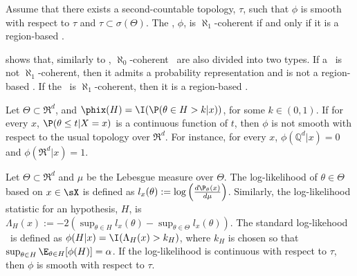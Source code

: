 \begin{theorem}
 \label{thm:second-countable}
 Assume that there exists 
 a second-countable topology, $\tau$, 
 such that $\phi$ is smooth
 with respect to $\tau$ and
 $\tau \subset \sigma(\Theta)$.
 The \summ, $\phi$, is $\aleph_1$-coherent
 if and only if
 it is a region-based \summ.
\end{theorem}

 shows that,
similarly to \stdsumms,
$\aleph_0$-coherent 
\summs \ are also 
divided into two types.
If a \summ \ is not $\aleph_1$-coherent, then
it admits a probability representation and
is not a region-based \summ.
If the \summ \ is $\aleph_1$-coherent, then
it is a region-based \summ.


\begin{example}
 Let $\Theta \subset \Re^d$, and $\phix(H) = \I(\P(\theta \in H > k|x))$, for some $k \in (0,1)$. If for every $x$, $\P(\theta \leq t|X=x)$ is a continuous function of $t$, then $\phi$ is not smooth with respect to the usual topology over $\Re^d$. For instance, for every $x$, $\phi(\mathbb{Q}^d|x) = 0$ and $\phi(\Re^d|x) = 1$.
\end{example}

\begin{example}
 Let $\Theta \subset \Re^d$ and
 $\mu$ be the Lebesgue measure over $\Theta$.
 The log-likelihood of $\theta \in \Theta$
 based on $x \in \sX$ is defined as
  $l_{x}(\theta)
 := \log\left(\frac{d\P_{\theta}(x)}{d\mu}\right)$.
 Similarly, the log-likelihood statistic for
 an hypothesis, $H$, is
 $\Lambda_{H}(x) :=
 -2\left(\sup_{\theta \in H}l_x(\theta) 
 - \sup_{\theta \in \Theta}l_x(\theta)\right)$.
 The standard log-likehood \summ \ is defined as
 $\phi(H|x) = \I(\Lambda_{H}(x) > k_{H})$,
 where $k_H$ is chosen so that
 $\sup_{\theta \in H} \E_{\theta \in H}[\phi(H)] = \alpha$.
 If the log-likelihood is continuous with respect to $\tau$,
 then $\phi$ is smooth 
 with respect to $\tau$.
\end{example}


